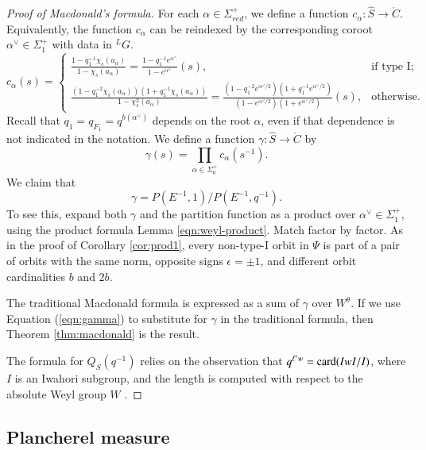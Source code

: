 \begin{proof}[Proof of Macdonald's formula]
For each $\alpha\in\Sigma^+_{red}$, we define
 a function $c_{\alpha}:\hat S\to\ring{C}$.
Equivalently, the function $c_\alpha$ can be reindexed by  the 
corresponding coroot $\alpha^\vee\in\Sigma^+_1$ with
data in ${}^LG$.  
\[
c_{\alpha}(s) = \begin{cases}
\frac{1 - q^{-1}_1 \chi_s (a_{\alpha})} {1 -\chi_s(a_{\alpha})} =
\frac{1 - q^{-1}_1 e^{\alpha^\vee}} {1 -e^{\alpha^\vee}} (s),
& \text{if type I; }\\[1em]
\frac{(1 - q^{-2}_1 \chi_s (a_{\alpha}))(1+ q^{-1}_1 \chi_s(a_\alpha))} {1 -\chi^2_s(a_{\alpha})} =
\frac{(1 - q^{-2}_1 e^{\alpha^\vee/2})(1+ q^{-1}_1 e^{\alpha^\vee/2})} {(1 - e^{\alpha^\vee/2})(1+e^{\alpha^\vee/2})} (s),
& \text{otherwise}.
\end{cases}
\]
Recall that $q_1 = q_{F_1} = q^{b(\alpha^\vee)}$ depends on the root $\alpha$, even if that dependence is not
indicated in the notation.
We define a function $\gamma:\hat S\to \ring{C}$ by
\[
\gamma(s) = \prod_{\alpha\in \Sigma^+_0} c_{\alpha}(s^{-1}).
\]
We claim that
\begin{equation}\label{eqn:gamma}
\gamma = P(E^{-1},1)/P(E^{-1},q^{-1}).
\end{equation}
To see this, expand both $\gamma$ and the partition function as a product over $\alpha^\vee\in \Sigma^+_1$,
using the product formula Lemma \ref{eqn:weyl-product}.  Match
factor by factor.  
As in the proof of Corollary \ref{cor:prod1},
every non-type-I orbit in $\Psi$ is part of
 a pair of orbits with the same norm, opposite signs $\epsilon=\pm 1$, and 
different orbit cardinalities $b$ and $2b$.

The traditional Macdonald formula is expressed as a sum of $\gamma$ over $W^\theta$.
If we use Equation (\ref{eqn:gamma}) to substitute for $\gamma$ in the traditional formula,
then Theorem \ref{thm:macdonald} is the result.

The formula for $Q_S(q^{-1})$ relies on the observation that $q^{\ell' w} = {\operatorname{card}}(IwI/I)$, where $I$
is an Iwahori subgroup, and the length is computed with respect to the absolute Weyl group $W$ \cite[p.74]{carter1985finite}.
\end{proof}

\subsection{Plancherel measure}

